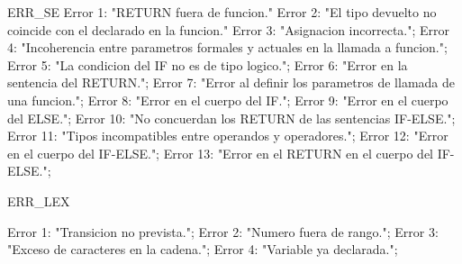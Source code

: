 ERR_SE
Error 1: "RETURN fuera de funcion."
Error 2: "El tipo devuelto no coincide con el declarado en la funcion."
Error 3: "Asignacion incorrecta.";
Error 4: "Incoherencia entre parametros formales y actuales en la llamada a funcion.";
Error 5: "La condicion del IF no es de tipo logico.";
Error 6: "Error en la sentencia del RETURN.";
Error 7: "Error al definir los parametros de llamada de una funcion.";
Error 8: "Error en el cuerpo del IF.";
Error 9: "Error en el cuerpo del ELSE.";
Error 10: "No concuerdan los RETURN de las sentencias IF-ELSE.";
Error 11: "Tipos incompatibles entre operandos y operadores.";
Error 12: "Error en el cuerpo del IF-ELSE.";
Error 13: "Error en el RETURN en el cuerpo del IF-ELSE.";

ERR_LEX

Error 1: "Transicion no prevista.";
Error 2: "Numero fuera de rango.";
Error 3: "Exceso de caracteres en la cadena.";
Error 4: "Variable ya declarada.";
				
